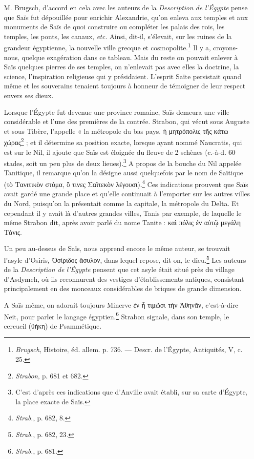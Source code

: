 \documentclass[letterpaper,twocolumn,openany,nodeprecatedcode]{dndbook}
\begin{document}
M. Brugsch, d'accord en cela avec les auteurs de la \emph{Description de l'Égypte} pense que Saïs fut dépouillée pour enrichir Alexandrie, qu'on enleva aux temples et aux monuments de Saïs de quoi construire ou compléter les palais des rois, les temples, les ponts, les canaux, \emph{etc.} Ainsi, dit-il, s'élevait, sur les ruines de la grandeur égyptienne, la nouvelle ville grecque et cosmopolite.\footnote{\emph{Brugsch}, Histoire, éd. allem. p. 736. --- Descr. de l'Égypte, Antiquités, V, c. 25.} Il y a, croyons-nous, quelque exagération dans ce tableau. Mais du reste on pouvait enlever à Saïs quelques pierres de ses temples, on n'enlevait pas avec elles la doctrine, la science, l'inspiration religieuse qui y présidaient. L'esprit Saïte persistait quand même et les souverains tenaient toujours à honneur de témoigner de leur respect envers ses dieux.

Lorsque l'Égypte fut devenue une province romaine, Saïs demeura une ville considérable et l'une des premières de la contrée. Strabon, qui vécut sous Auguste et sous Tibère, l'appelle « la métropole du bas pays, ἡ μητρόπολις τῆς κάτω χώρας\footnote{\emph{Strabon}, p. 681 et 682.} ; et il détermine sa position exacte, lorsque ayant nommé Naucratis, qui est sur le Nil, il ajoute que Saïs est éloignée du fleuve de 2 schènes (c.-à-d. 60 stades, soit un peu plus de deux lieues).\footnote{C'est d'après ces indications que d'Anville avait établi, sur sa carte d'Égypte, la place exacte de Saïs.} A propos de la bouche du Nil appelée Tanitique, il remarque qu'on la désigne aussi quelquefois par le nom de Saïtique (τὸ Τανιτικὸν στόμα, ὃ τινες Σαϊτεκὸν λέγουσι).\footnote{\emph{Strab.}, p. 682, 8.} Ces indications prouvent que Saïs avait gardé une grande place et qu'elle continuait à l'emporter sur les autres villes du Nord, puisqu’on la présentait comme la capitale, la métropole du Delta. Et cependant il y avait là d'autres grandes villes, Tanis par exemple, de laquelle le même Strabon dit, après avoir parlé du nome Tanite : καὶ πόλις ἐν αὐτῷ μεγάλη Τάνις.

Un peu au-dessus de Saïs, nous apprend encore le même auteur, se trouvait l'asyle d'Osiris, Ὀσἰριδος ἄσυλον, dans lequel repose, dit-on, le dieu.\footnote{\emph{Strab.}, p. 682, 23.} Les auteurs de la \emph{Description de l'Égypte} pensent que cet asyle était situé près du village d'Asdymeh, où ils reconnurent des vestiges d'établissements antiques, consistant principalement en des monceaux considérables de briques de grande dimension.

A Saïs même, on adorait toujours Minerve ἐν ἦ τιμῶσι τὴν Ἀθηνᾶν, c'est-à-dire Neit, pour parler le langage égyptien.\footnote{\emph{Strab.}, p. 681.} Strabon signale, dans son temple, le cercueil (θήκη) de Psammétique.
\end{document}
